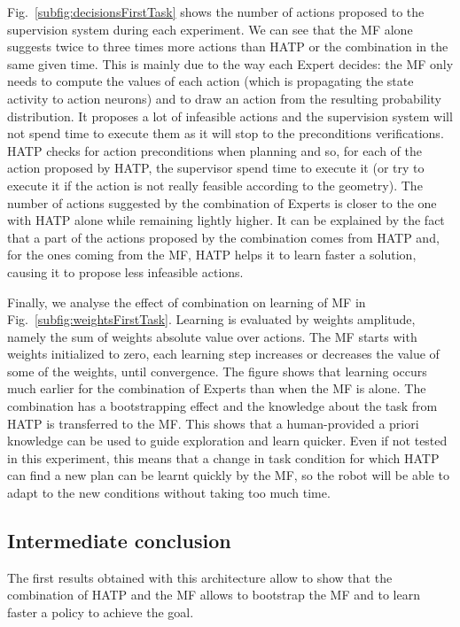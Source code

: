 \documentclass[english,a4paper,11pt,twoside]{StyleThese}
\begin{document}
Fig.~\ref{subfig:decisionsFirstTask} shows the number of actions proposed to the supervision system during each experiment. We can see that the MF alone suggests twice to three times more actions than HATP or the combination in the same given time. This is mainly due to the way each Expert decides: the MF only needs to compute the values of each action (which is propagating the state activity to action neurons) and to draw an action from the resulting probability distribution. It proposes a lot of infeasible actions and the supervision system will not spend time to execute them as it will stop to the preconditions verifications. HATP checks for action preconditions when planning and so, for each of the action proposed by HATP, the supervisor spend time to execute it (or try to execute it if the action is not really feasible according to the geometry). The number of actions suggested by the combination of Experts is closer to the one with HATP alone while remaining lightly higher. It can be explained by the fact that a part of the actions proposed by the combination comes from HATP and, for the ones coming from the MF, HATP helps it to learn faster a solution, causing it to propose less infeasible actions.

Finally, we analyse the effect of combination on learning of MF in Fig.~\ref{subfig:weightsFirstTask}. Learning is evaluated by weights amplitude, namely the sum of weights absolute value over actions. The MF starts with weights initialized to zero, each learning step increases or decreases the value of some of the weights, until convergence. The figure shows that learning occurs much earlier for the combination of Experts than when the MF is alone. The combination has a bootstrapping effect and the knowledge about the task from HATP is transferred to the MF. This shows that a human-provided a priori knowledge can be used to guide exploration and learn quicker. Even if not tested in this experiment, this means that a change in task condition for which HATP can find a new plan can be learnt quickly by the MF, so the robot will be able to adapt to the new conditions without taking too much time.

\subsection{Intermediate conclusion}

The first results obtained with this architecture allow to show that the combination of HATP and the MF allows to bootstrap the MF and to learn faster a policy to achieve the goal.
\end{document}
